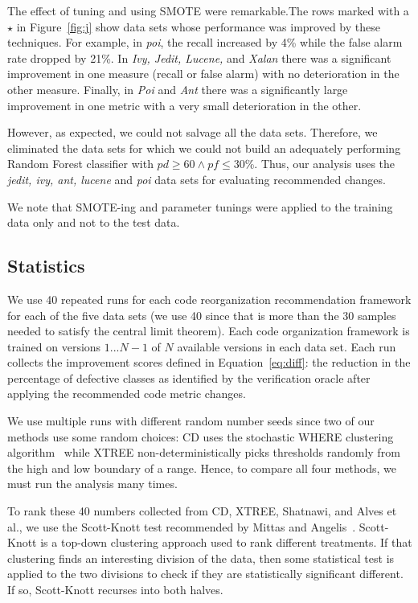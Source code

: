 \documentclass[twocolumn,5p]{elsarticle}
\newcommand{\fig}[1]{Figure~\ref{fig:#1}}
\newcommand{\eq}[1]{Equation~\ref{eq:#1}}
\theoremstyle{break}
\begin{document}
{	The effect of tuning and using SMOTE were remarkable.The rows 
	\colorbox{celadon}{marked with a $\star$} in \fig{j} show data 
	sets whose performance was improved by these techniques. For 
	example, in {\em poi}, the recall increased by 4\% while the false alarm 
	rate dropped by 21\%. In \textit{Ivy, Jedit, Lucene,} and \textit{Xalan} 
	there was a 
	significant improvement in one measure (recall or false alarm) with no 
	deterioration in the other measure. Finally, in \textit{Poi} and 
	\textit{Ant} there was a significantly large improvement in one metric with 
	a very small deterioration in the other. 
	
	
	However, as expected, we could not salvage all the data 
	sets. Therefore, we eliminated the data sets for which we could not build 
	an adequately performing Random Forest classifier with $\mathit{pd}\ge 60 
	\wedge \mathit{pf} \le 30$\%. Thus, our analysis uses the {\em jedit, ivy, 
	ant, lucene} and {\em poi} data sets for evaluating recommended changes.}
	
	We note that SMOTE-ing and
	parameter tunings were applied to the training data only and not to the 
	test data.
	
	\subsection{Statistics}
	
	
	We use 40 repeated runs for each code reorganization recommendation 
	framework 
	for each of the five data sets (we use 40 since that is  more than the 30 
	samples  needed to satisfy the central limit theorem). Each code 
	organization framework is trained on versions $1...N-1$ of $N$ available 
	versions in each data set.
	Each run collects the improvement scores defined in \eq{diff}: the 
	reduction in the percentage of defective classes as identified by the 
	verification oracle after applying the recommended code metric changes.
	
	We use multiple runs with different random number seeds since two of our 
	methods use some random choices: CD uses the  stochastic WHERE clustering 
	algorithm~\cite{me12d}
	while XTREE non-deterministically picks thresholds randomly from
	the high and low boundary of a range.
	Hence, to compare all
	four methods, we must run the analysis many times.
	
	
	
	
	
	To rank these 40 numbers collected from CD, XTREE, Shatnawi, and Alves et 
	al., we use the Scott-Knott test recommended by Mittas and 
	Angelis~\cite{mittas13}.
	Scott-Knott is a top-down clustering approach used to rank different
	treatments. If that clustering finds an interesting division of the data, 
	then
	some statistical test is applied to the two divisions to check if they
	are statistically significant different. If so, Scott-Knott recurses
	into both halves.
	
\end{document}
